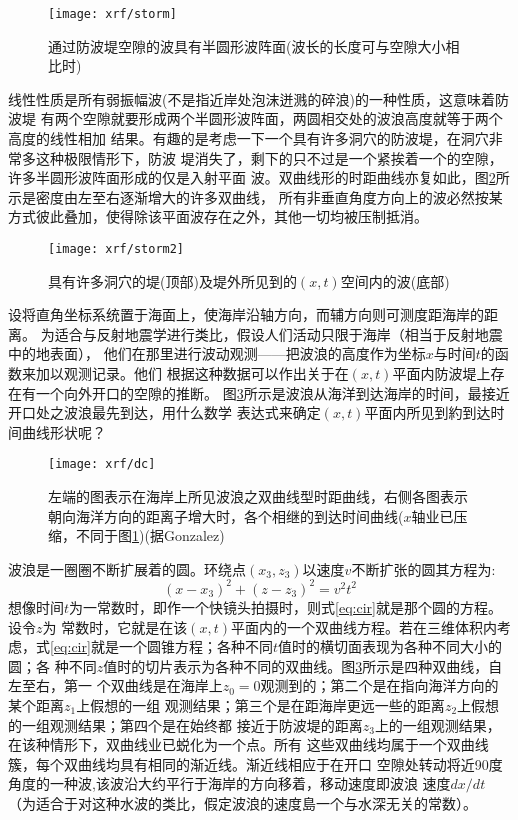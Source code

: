 \begin{figure}[H]
\centering
\texttt{[image: xrf/storm]}
\caption[惠更斯]{通过防波堤空隙的波具有半圆形波阵面(波长的长度可与空隙大小相比时)}
\label{fig:xrf/storm}
\end{figure}

线性性质是所有弱振幅波(不是指近岸处泡沫迸溅的碎浪)的一种性质，这意味着防波堤
有两个空隙就要形成两个半圆形波阵面，两圆相交处的波浪高度就等于两个高度的线性相加
结果。有趣的是考虑一下一个具有许多洞穴的防波堤，在洞穴非常多这种极限情形下，防波
堤消失了，剩下的只不过是一个紧挨着一个的空隙，许多半圆形波阵面形成的仅是入射平面
波。双曲线形的时距曲线亦复如此，图\ref{fig:xrf/storm2}所示是密度由左至右逐渐增大的许多双曲线，
所有非垂直角度方向上的波必然按某方式彼此叠加，使得除该平面波存在之外，其他一切均被压制抵消。

\begin{figure}[H]
\centering
\texttt{[image: xrf/storm2]}
\caption[惠更斯]{具有许多洞穴的堤(顶部)及堤外所见到的$(x,t)$空间内的波(底部)}
\label{fig:xrf/storm2}
\end{figure}

设将直角坐标系统置于海面上，使海岸沿轴方向，而辅方向则可测度距海岸的距离。
为适合与反射地震学进行类比，假设人们活动只限于海岸（相当于反射地震中的地表面），
他们在那里进行波动观测------把波浪的高度作为坐标$x$与时间$t$的函数来加以观测记录。他们
根据这种数据可以作出关于在$(x,t)$平面内防波堤上存在有一个向外开口的空隙的推断。
图\ref{fig:xrf/dc}所示是波浪从海洋到达海岸的时间，最接近开口处之波浪最先到达，用什么数学
表达式来确定$(x,t)$平面内所见到約到达时间曲线形状呢？

\begin{figure}[H]
\centering
\texttt{[image: xrf/dc]}
\caption[dc]{左端的图表示在海岸上所见波浪之双曲线型时距曲线，右侧各图表示朝向海洋方向的距离子增大时，各个相继的到达时间曲线($x$轴业已压缩，不同于图\ref{fig:xrf/storm})(据Gonzalez)}
\label{fig:xrf/dc}
\end{figure}
波浪是一圈圈不断扩展着的圆。环绕点$(x_{3},z_{3})$以速度$v$不断扩张的圆其方程为:
\begin{equation}\label{eq:cir}
(x-x_{3})^{2}+(z-z_{3})^{2}=v^{2}t^{2}
\end{equation}
想像时间$t$为一常数时，即作一个快镜头拍摄时，则式\ref{eq:cir}就是那个圆的方程。设令$z$为
常数时，它就是在该$(x,t)$平面内的一个双曲线方程。若在三维体积内考
虑，式\ref{eq:cir}就是一个圆锥方程；各种不同$t$值时的横切面表现为各种不同大小的圆；各
种不同$z$值时的切片表示为各种不同的双曲线。图\ref{fig:xrf/dc}所示是四种双曲线，自左至右，第一
个双曲线是在海岸上$z_{0}=0$观测到的；第二个是在指向海洋方向的某个距离$z_{1}$上假想的一组
观测结果；第三个是在距海岸更远一些的距离$z_{2}$上假想的一组观测结果；第四个是在始终都
接近于防波堤的距离$z_{3}$上的一组观测结果，在该种情形下，双曲线业已蜕化为一个点。所有
这些双曲线均属于一个双曲线簇，每个双曲线均具有相同的渐近线。渐近线相应于在开口
空隙处转动将近90度角度的一种波,该波沿大约平行于海岸的方向移着，移动速度即波浪
速度$dx/dt$（为适合于对这种水波的类比，假定波浪的速度島一个与水深无关的常数）。

